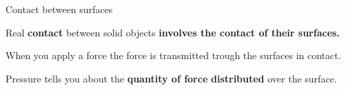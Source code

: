 \documentclass[usenames,dvipsnames]{beamer}
\begin{document}
\begin{frame}{\huge{Contact between surfaces}}

\begin{itemize}
    \Large{\item Real \textbf{contact} between solid objects \textbf{involves  the contact of their surfaces.}}
    \item When you apply a force the force is transmitted trough the surfaces in contact.
    \item Pressure tells you about the \textbf{quantity of force} \textbf{distributed} over the surface.
\end{itemize}








\end{frame}







        
\end{document}
